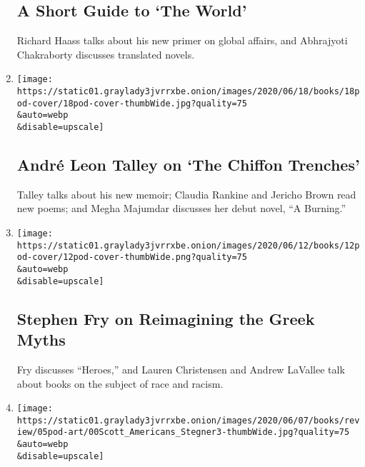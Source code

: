 \begin{enumerate}
  \hypertarget{a-short-guide-to-the-world}{%
  \subsection{A Short Guide to `The
  World'}\label{a-short-guide-to-the-world}}

  Richard Haass talks about his new primer on global affairs, and
  Abhrajyoti Chakraborty discusses translated novels.
\item
  \href{/2020/06/18/books/review/andre-leon-talley-chiffon-trenches-claudia-rankine-jericho-brown-megha-majumdar-burning.html}{}

  \texttt{[image: https://static01.graylady3jvrrxbe.onion/images/2020/06/18/books/18pod-cover/18pod-cover-thumbWide.jpg?quality=75\\\&auto=webp\\\&disable=upscale]}

  \hypertarget{andruxe9-leon-talley-on-the-chiffon-trenches}{%
  \subsection{André Leon Talley on `The Chiffon
  Trenches'}\label{andruxe9-leon-talley-on-the-chiffon-trenches}}

  Talley talks about his new memoir; Claudia Rankine and Jericho Brown
  read new poems; and Megha Majumdar discusses her debut novel, ``A
  Burning.''
\item
  \href{/2020/06/12/books/review/podcast-stephen-fry-heroes-greek-myths.html}{}

  \texttt{[image: https://static01.graylady3jvrrxbe.onion/images/2020/06/12/books/12pod-cover/12pod-cover-thumbWide.png?quality=75\\\&auto=webp\\\&disable=upscale]}

  \hypertarget{stephen-fry-on-reimagining-the-greek-myths}{%
  \subsection{Stephen Fry on Reimagining the Greek
  Myths}\label{stephen-fry-on-reimagining-the-greek-myths}}

  Fry discusses ``Heroes,'' and Lauren Christensen and Andrew LaVallee
  talk about books on the subject of race and racism.
\item
  \href{/2020/06/05/books/review/podcast-a-o-scott-wallace-stegner-sunny-days-david-kamp.html}{}

  \texttt{[image: https://static01.graylady3jvrrxbe.onion/images/2020/06/07/books/review/05pod-art/00Scott\_Americans\_Stegner3-thumbWide.jpg?quality=75\\\&auto=webp\\\&disable=upscale]}


\end{enumerate}
